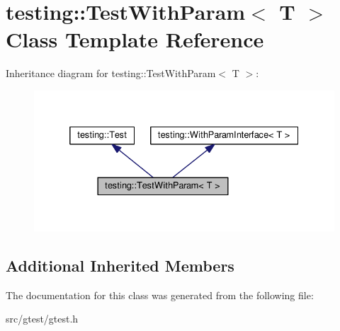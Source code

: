 \hypertarget{classtesting_1_1_test_with_param}{}\section{testing\+:\+:Test\+With\+Param$<$ T $>$ Class Template Reference}
\label{classtesting_1_1_test_with_param}


Inheritance diagram for testing\+:\+:Test\+With\+Param$<$ T $>$\+:
\nopagebreak
\begin{figure}[H]
\begin{center}
\leavevmode
\includegraphics[width=332pt]{classtesting_1_1_test_with_param__inherit__graph}
\end{center}
\end{figure}
\subsection*{Additional Inherited Members}


The documentation for this class was generated from the following file\+:\begin{DoxyCompactItemize}
\item 
src/gtest/gtest.\+h\end{DoxyCompactItemize}

